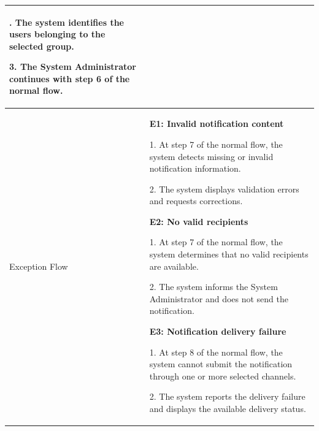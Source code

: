 \begin{longtable}{|>{\bfseries\raggedright\arraybackslash}p{}|>{\raggedright\arraybackslash}p{}|}
2. The system identifies the users belonging to the selected group. \par
3. The System Administrator continues with step 6 of the normal flow. \\ \hline
Exception Flow &
\textbf{E1: Invalid notification content} \par
1. At step 7 of the normal flow, the system detects missing or invalid notification information. \par
2. The system displays validation errors and requests corrections. \par\vspace{4pt}
\textbf{E2: No valid recipients} \par
1. At step 7 of the normal flow, the system determines that no valid recipients are available. \par
2. The system informs the System Administrator and does not send the notification. \par\vspace{4pt}
\textbf{E3: Notification delivery failure} \par
1. At step 8 of the normal flow, the system cannot submit the notification through one or more selected channels. \par
2. The system reports the delivery failure and displays the available delivery status. \\ \hline
\end{longtable}


